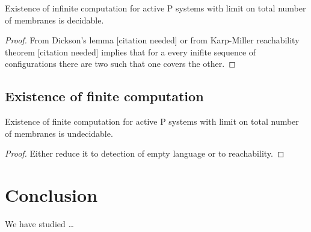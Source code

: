 \documentclass[llncs,submission,copyright,creativecommons]{../lib/lncs/llncs}
\begin{document}
\begin{theorem}
  Existence of infinite computation for active P systems with limit on total number of membranes is decidable.
\end{theorem}

\begin{proof}
  From Dickson's lemma [citation needed] or from Karp-Miller reachability theorem [citation needed] implies that for a every inifite sequence of configurations there are two such that one covers the other.
\end{proof}


\subsection{Existence of finite computation} %
\label{sub:existence_of_finite_computation}

\begin{theorem}
  Existence of finite computation for active P systems with limit on total number of membranes is undecidable.
\end{theorem}

\begin{proof}
  Either reduce it to detection of empty language or to reachability.
\end{proof}



\section{Conclusion}
\label{sec:conclusion}
We have studied \dots


\end{document}
